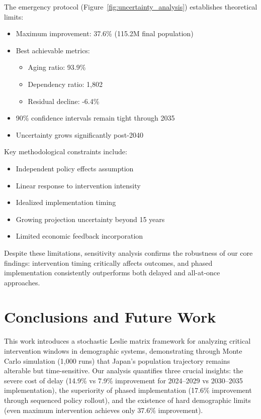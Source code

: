 \documentclass{article} %
\begin{document}
The emergency protocol (Figure~\ref{fig:uncertainty_analysis}) establishes theoretical limits:
\begin{itemize}
    \item Maximum improvement: 37.6\% (115.2M final population)
    \item Best achievable metrics:
        \begin{itemize}
            \item Aging ratio: 93.9\%
            \item Dependency ratio: 1,802
            \item Residual decline: -6.4\%
        \end{itemize}
    \item 90\% confidence intervals remain tight through 2035
    \item Uncertainty grows significantly post-2040
\end{itemize}

Key methodological constraints include:
\begin{itemize}
    \item Independent policy effects assumption
    \item Linear response to intervention intensity
    \item Idealized implementation timing
    \item Growing projection uncertainty beyond 15 years
    \item Limited economic feedback incorporation
\end{itemize}

Despite these limitations, sensitivity analysis confirms the robustness of our core findings: intervention timing critically affects outcomes, and phased implementation consistently outperforms both delayed and all-at-once approaches.

\section{Conclusions and Future Work}
\label{sec:conclusion}

This work introduces a stochastic Leslie matrix framework for analyzing critical intervention windows in demographic systems, demonstrating through Monte Carlo simulation (1,000 runs) that Japan's population trajectory remains alterable but time-sensitive. Our analysis quantifies three crucial insights: the severe cost of delay (14.9\% vs 7.9\% improvement for 2024--2029 vs 2030--2035 implementation), the superiority of phased implementation (17.6\% improvement through sequenced policy rollout), and the existence of hard demographic limits (even maximum intervention achieves only 37.6\% improvement).
\end{document}
